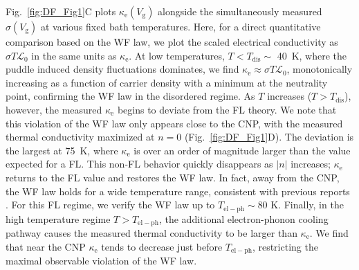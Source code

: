 Fig.~\ref{fig:DF_Fig1}C plots $\kappa_{\mathrm{e}}(V_{\mathrm{g}})$ alongside the simultaneously measured $\sigma(V_{\mathrm{g}})$ at various fixed bath temperatures. Here, for a direct quantitative comparison based on the WF law, we plot the scaled electrical conductivity as $\sigma T\mathcal{L}_0$ in the same units as $\kappa_{\mathrm{e}}$. At low temperatures, $T<T_{\mathrm{dis}}\sim$ 40~K, where the puddle induced density fluctuations dominates, we find $\kappa_{\mathrm{e}}\approx\sigma T\mathcal{L}_0$, monotonically increasing as a function of carrier density with a minimum at the neutrality point, confirming the WF law in the disordered regime. As $T$ increases ($T>T_{\mathrm{dis}}$), however, the measured $\kappa_{\mathrm{e}}$ begins to deviate from the FL theory. We note that this violation of the WF law only appears close to the CNP, with the measured thermal conductivity maximized at $n=0$ (Fig.~\ref{fig:DF_Fig1}D).
The deviation is the largest at  75~K, where $\kappa_{\mathrm{e}}$ is over an order of magnitude larger than the value expected for a FL.   This non-FL behavior quickly disappears as $|n|$ increases; $\kappa_{\mathrm{e}}$ returns to the FL value and restores the WF law.   In fact, away from the CNP, the WF law holds for a wide temperature range, consistent with previous reports \cite{crossno_development_2015, yigen_wiedemann-franz_2014, fong_measurement_2013}.    For this FL regime, we verify the WF law up to $T_{\mathrm{el-ph}} \sim 80$ K.  Finally, in the high temperature regime $T>T_{\mathrm{el-ph}}$, the additional electron-phonon cooling pathway causes the measured thermal conductivity to be larger than $\kappa_{\mathrm{e}}$.  We find that near the CNP $\kappa_{\mathrm{e}}$ tends to decrease just before $T_{\mathrm{el-ph}}$, restricting the maximal observable violation of the WF law.

